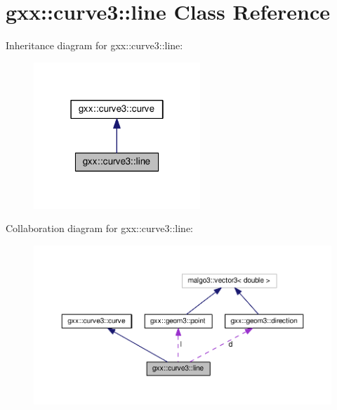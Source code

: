 \hypertarget{classgxx_1_1curve3_1_1line}{}\section{gxx\+:\+:curve3\+:\+:line Class Reference}
\label{classgxx_1_1curve3_1_1line}


Inheritance diagram for gxx\+:\+:curve3\+:\+:line\+:
\nopagebreak
\begin{figure}[H]
\begin{center}
\leavevmode
\includegraphics[width=178pt]{classgxx_1_1curve3_1_1line__inherit__graph}
\end{center}
\end{figure}


Collaboration diagram for gxx\+:\+:curve3\+:\+:line\+:
\nopagebreak
\begin{figure}[H]
\begin{center}
\leavevmode
\includegraphics[width=350pt]{classgxx_1_1curve3_1_1line__coll__graph}
\end{center}
\end{figure}
